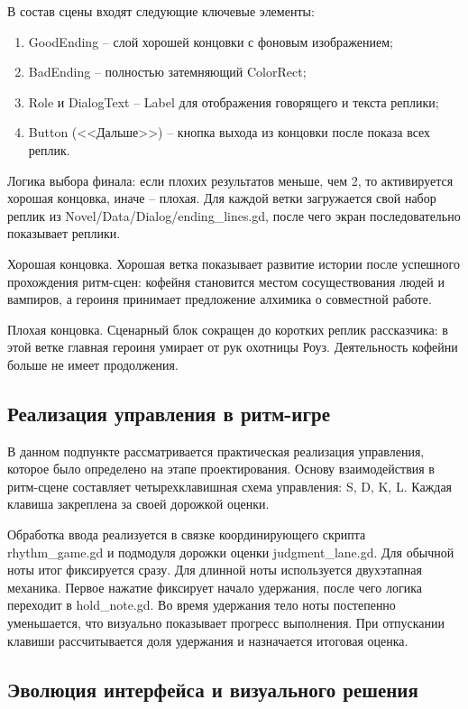 \documentclass[utf8, russian]{eskdtext}
\numberwithin{equation}{section}
\newcounter{game_cnt}
\begin{document}
В состав сцены входят следующие ключевые элементы:
\begin{enumerate}
    \item GoodEnding -- слой хорошей концовки с фоновым изображением;
    \item BadEnding -- полностью затемняющий ColorRect;
    \item Role и DialogText -- Label для отображения говорящего и текста реплики;
    \item Button (<<Дальше>>) -- кнопка выхода из концовки после показа всех реплик.
\end{enumerate}

Логика выбора финала: если плохих результатов меньше, чем 2, то активируется хорошая концовка, иначе -- плохая. Для каждой ветки загружается свой набор реплик из Novel/Data/Dialog/ending\_lines.gd, после чего экран последовательно показывает реплики.

Хорошая концовка.
Хорошая ветка показывает развитие истории после успешного прохождения ритм-сцен: кофейня становится местом сосуществования людей и вампиров, а героиня принимает предложение алхимика о совместной работе. 

Плохая концовка.
Сценарный блок сокращен до коротких реплик рассказчика: в этой ветке главная героиня умирает от рук охотницы Роуз. Деятельность кофейни больше не имеет продолжения. 

\subsection{Реализация управления в ритм-игре}

В данном подпункте рассматривается практическая реализация управления, которое было определено на этапе проектирования. Основу взаимодействия в ритм-сцене составляет четырехклавишная схема управления: S, D, K, L. Каждая клавиша закреплена за своей дорожкой оценки.

Обработка ввода реализуется в связке координирующего скрипта rhythm\_game.gd и подмодуля дорожки оценки judgment\_lane.gd. Для обычной ноты итог фиксируется сразу. Для длинной ноты используется двухэтапная механика. Первое нажатие фиксирует начало удержания, после чего логика переходит в hold\_note.gd. Во время удержания тело ноты постепенно уменьшается, что визуально показывает прогресс выполнения. При отпускании клавиши рассчитывается доля удержания и назначается итоговая оценка.

\subsection{Эволюция интерфейса и визуального решения}
\end{document}

